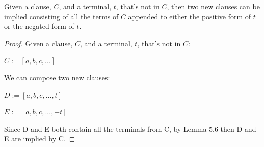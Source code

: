 \documentclass[manuscript]{acmart}
\begin{document}
    \begin{lemma}[Expansion]
        Given a clause, $C$, and a terminal, $t$, that's not in $C$, then two new clauses can be implied consisting of all the terms of $C$ appended to either the positive form of $t$ or the negated form of $t$.
    \end{lemma}
    \begin{proof}
        Given a clause, $C$, and a terminal, $t$, that's not in $C$:

        $C := [a, b, c, ...]$

        We can compose two new clauses:

        $D := [a, b, c, ..., t]$

        $E := [a, b, c, ..., -t]$

        Since D and E both contain all the terminals from C, by Lemma 5.6 then D and E are implied by C.   
    \end{proof}
\end{document}

